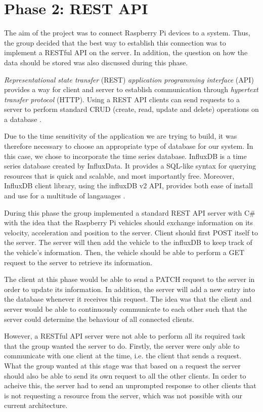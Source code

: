 \section{Phase 2: REST API}\label{phase2}
The aim of the project was to connect Raspberry Pi devices to a system. Thus, the group decided that the best way to establish this connection was to implement a RESTful API on the server. In addition, the question on how the data should be stored was also discussed during this phase.

\emph{Representational state transfer} (REST) \emph{application programming interface} (API) provides a way for client and server to establish communication through \emph{hypertext transfer protocol} (HTTP). Using a REST API clients can send requests to a server to perform standard CRUD (create, read, update and delete) operations on a database \parencite{rest_api}.

Due to the time sensitivity of the application we are trying to build, it was therefore necessary to choose an appropriate type of database for our system. In this case, we chose to incorporate the time series database. InfluxDB is a time series database created by InfluxData. It provides a SQL-like syntax for querying resources that is quick and scalable, and most importantly free. Moreover, InfluxDB client library, using the influxDB v2 API, provides both ease of install and use for a multitude of langauages \parencite{influxdb}.

During this phase the group implemented a standard REST API server with C\# with the idea that the Raspberry Pi vehicles should exchange information on its velocity, acceleration and position to the server. Client should first POST itself to the server. The server will then add the vehicle to the influxDB to keep track of the vehicle's information. Then, the vehicle should be able to perform a GET request to the server to retrieve its information.

The client at this phase would be able to send a PATCH request to the server in order to update its information. In addition, the server will add a new entry into the database whenever it receives this request. The idea was that the client and server would be able to continuously communicate to each other such that the server could determine the behaviour of all connected clients.

However, a RESTful API server were not able to perform all its required task that the group wanted the server to do. Firstly, the server were only able to communicate with one client at the time, i.e. the client that sends a request. What the group wanted at this stage was that based on a request the server should also be able to send its own request to all the other clients. In order to acheive this, the server had to send an unprompted response to other clients that is not requesting a resource from the server, which was not possible with our current architecture.

